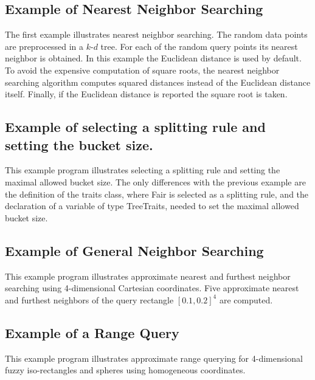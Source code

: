 \subsection{Example of Nearest Neighbor Searching}

The first example illustrates nearest neighbor searching. The random data points are preprocessed
in a $k$-$d$ tree. For each of the random query points its nearest neighbor is obtained.
In this example
the Euclidean distance is used by default. To avoid the expensive computation
of square roots, the nearest neighbor searching algorithm computes
squared distances instead of the Euclidean distance itself. 
Finally, if the Euclidean distance is reported the square root is taken.


\subsection{Example of selecting a splitting rule and setting the bucket size.}

This example program illustrates selecting a splitting rule and setting the maximal
allowed bucket size.
The only differences with the previous example are the
definition of the traits class, where Fair is selected as a splitting rule,
and the declaration of a variable  of type TreeTraits, needed to set the 
maximal allowed bucket size.


\subsection{Example of General Neighbor Searching}

This example program illustrates approximate nearest and furthest neighbor searching
using 4-dimensional Cartesian coordinates.
Five approximate nearest and furthest neighbors of
the query rectangle $[0.1,0.2]^4$ are computed.
 

\subsection{Example of a Range Query}

This example program illustrates approximate range querying for
4-dimensional fuzzy iso-rectangles and spheres
using homogeneous coordinates.

